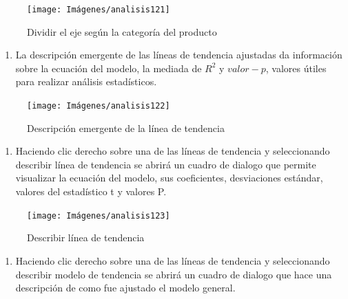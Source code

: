 \documentclass[
]{book}
\providecommand{\tightlist}{%
  \setlength{\itemsep}{0pt}\setlength{\parskip}{0pt}}
\begin{document}
\begin{figure}

{\centering \texttt{[image: Imágenes/analisis121]} 

}

\caption{Dividir el eje según la categoría del producto}\label{fig:paso6dispersion-fig}
\end{figure}

\begin{enumerate}
\def\labelenumi{\arabic{enumi}.}
\setcounter{enumi}{6}
\tightlist
\item
  La descripción emergente de las líneas de tendencia ajustadas da información sobre la ecuación del modelo, la mediada de \(R^2\) y \(valor-p\), valores útiles para realizar análisis estadísticos.
\end{enumerate}

\begin{figure}

{\centering \texttt{[image: Imágenes/analisis122]} 

}

\caption{Descripción emergente de la línea de tendencia}\label{fig:paso7dispersion-fig}
\end{figure}

\begin{enumerate}
\def\labelenumi{\arabic{enumi}.}
\setcounter{enumi}{7}
\tightlist
\item
  Haciendo clic derecho sobre una de las líneas de tendencia y seleccionando describir línea de tendencia se abrirá un cuadro de dialogo que permite visualizar la ecuación del modelo, sus coeficientes, desviaciones estándar, valores del estadístico t y valores P.
\end{enumerate}

\begin{figure}

{\centering \texttt{[image: Imágenes/analisis123]} 

}

\caption{Describir línea de tendencia}\label{fig:paso8dispersion-fig}
\end{figure}

\begin{enumerate}
\def\labelenumi{\arabic{enumi}.}
\setcounter{enumi}{8}
\tightlist
\item
  Haciendo clic derecho sobre una de las líneas de tendencia y seleccionando describir modelo de tendencia se abrirá un cuadro de dialogo que hace una descripción de como fue ajustado el modelo general.
\end{enumerate}
\end{document}
